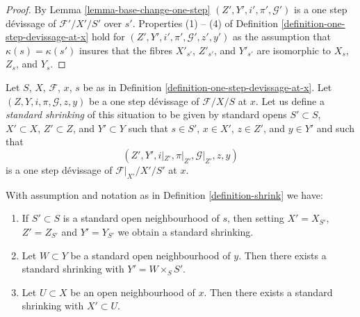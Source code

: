\begin{proof}
By
Lemma \ref{lemma-base-change-one-step}
$(Z', Y', i', \pi', \mathcal{G}')$ is a one step d\'evissage of
$\mathcal{F}'/X'/S'$ over $s'$. Properties (1) -- (4) of
Definition \ref{definition-one-step-devissage-at-x}
hold for $(Z', Y', i', \pi', \mathcal{G}', z', y')$
as the assumption that $\kappa(s) = \kappa(s')$ insures that the fibres
$X'_{s'}$, $Z'_{s'}$, and $Y'_{s'}$ are isomorphic to
$X_s$, $Z_s$, and $Y_s$.
\end{proof}

\begin{definition}
\label{definition-shrink}
Let $S$, $X$, $\mathcal{F}$, $x$, $s$ be as in
Definition \ref{definition-one-step-devissage-at-x}.
Let $(Z, Y, i, \pi, \mathcal{G}, z, y)$ be a one step d\'evissage
of $\mathcal{F}/X/S$ at $x$. Let us define a
{\it standard shrinking} of this situation to be
given by standard opens $S' \subset S$, $X' \subset X$, $Z' \subset Z$,
and $Y' \subset Y$ such that $s \in S'$, $x \in X'$, $z \in Z'$, and
$y \in Y'$ and such that
$$
(Z', Y', i|_{Z'}, \pi|_{Z'}, \mathcal{G}|_{Z'}, z, y)
$$
is a one step d\'evissage of $\mathcal{F}|_{X'}/X'/S'$ at $x$.
\end{definition}

\begin{lemma}
\label{lemma-shrink}
With assumption and notation as in
Definition \ref{definition-shrink}
we have:
\begin{enumerate}
\item
\label{item-shrink-base}
If $S' \subset S$ is a standard open neighbourhood of $s$, then
setting $X' = X_{S'}$, $Z' = Z_{S'}$ and $Y' = Y_{S'}$ we obtain a
standard shrinking.
\item
\label{item-shrink-on-Y}
Let $W \subset Y$ be a standard open neighbourhood of $y$.
Then there exists a standard shrinking with $Y' = W \times_S S'$.
\item
\label{item-shrink-on-X}
Let $U \subset X$ be an open neighbourhood of $x$.
Then there exists a standard shrinking with $X' \subset U$.
\end{enumerate}
\end{lemma}

